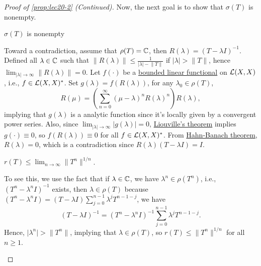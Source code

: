 \begin{proof}[Proof of \autoref{prop:lec20-2} (Continued)]
	Now, the next goal is to show that \(\sigma (T)\) is nonempty.
	\begin{claim}
		\(\sigma (T)\) is nonempty
	\end{claim}
	\begin{explanation}
		Toward a contradiction, assume that \(\rho (T) = \mathbb{\MakeUppercase{c}} \), then \(R(\lambda ) = (T-\lambda I)^{-1} \). Defined all \(\lambda \in \mathbb{\MakeUppercase{c}} \) such that \(\lVert R(\lambda ) \rVert \leq \frac{1}{\vert \lambda  \vert - \lVert T \rVert }\) if \(\vert \lambda  \vert > \lVert T \rVert \), hence \(\lim_{\vert \lambda  \vert \to \infty} \lVert R(\lambda ) \rVert = 0\). Let \(f(\cdot)\) be a \hyperref[def:bounded-linear-functional]{bounded linear functional} on \(\mathcal{\MakeUppercase{l}} (X, X)\), i.e., \(f\in \mathcal{\MakeUppercase{l}} (X, X)^{\ast} \). Set \(g(\lambda ) = f(R(\lambda ))\), for any \(\lambda _0\in \rho (T)\),
		\[
			R(\mu ) = \left( \sum_{n=0}^{\infty} (\mu -\lambda )^n R(\lambda )^n  \right) R(\lambda ),
		\]
		implying that \(g(\lambda )\) is a analytic function since it's locally given by a convergent power series. Also, since \(\lim_{\vert \lambda \vert \to \infty} \vert g(\lambda ) \vert = 0\), \href{https://en.wikipedia.org/wiki/Liouville's_theorem_(complex_analysis)}{Liouville's theorem} implies \(g(\cdot) \equiv 0\), so \(f(R(\lambda ))\equiv 0\) for all \(f\in \mathcal{\MakeUppercase{l}} (X, X)^{\ast} \). From \hyperref[thm:Hahn-Banach]{Hahn-Banach theorem}, \(R(\lambda ) = 0\), which is a contradiction since \(R(\lambda )(T-\lambda I) = I\).
	\end{explanation}

	\begin{claim}
		\(r(T) \leq \lim_{n \to \infty} \lVert T^n \rVert ^{1 / n}\).
	\end{claim}
	\begin{explanation}
		To see this, we use the fact that if \(\lambda \in \mathbb{\MakeUppercase{c}} \), we have \(\lambda ^n \in \rho (T^n)\), i.e., \((T^n - \lambda ^n I)^{-1} \) exists, then \(\lambda \in \rho (T)\) because \((T^n - \lambda ^n I) = (T - \lambda I)\sum_{j=0}^{n-1} \lambda ^j T^{n-1-j}\), we have
		\[
			(T-\lambda I)^{-1} = (T^n - \lambda ^n I)^{-1} \sum_{j=0}^{n-1} \lambda ^j T^{n-1-j}.
		\]
		Hence, \(\vert \lambda ^n \vert > \lVert T^n \rVert \), implying that \(\lambda \in \rho (T)\), so \(r(T) \leq \lVert T^n \rVert ^{1 / n}\) for all \(n\geq 1\).
	\end{explanation}


\end{proof}
